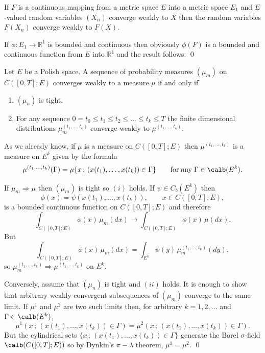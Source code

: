 \documentclass[preprint]{imsart}
\def\R{\mathbb R}
\begin{document}
{\begin{Proposition}
If $F$ is a continuous mapping from a metric space $E$
into a metric space $E_1$ and $E$-valued random
variables $(X_n)$ converge weakly to $X$ then the
random variables $F(X_n)$ converge weakly to $F(X)$.
\end{Proposition}

If $\phi : E_1\to\R^1$ is bounded and continuous then
obviously $\phi(F)$ is a bounded and continuous
function from $E$ into $\R^1$ and the result follows.
\qed

\begin{Theorem}
Let $E$ be a  Polish space.
A sequence of probability measures $(\mu_m)$ on
$C([0,T];E)$
 converges weakly to a measure $\mu$ if and only if
\begin{enumerate}
  \item[(i)] $(\mu_n)$ is tight.

  \item[(ii)] For any sequence $0=t_0\leq t_1\leq t_2
  \leq\ldots\leq t_k\leq T$ the finite dimensional
  distributions $\mu_m^{(t_1,\ldots ,t_k)}$ converge
  weakly to $\mu^{(t_1,\ldots ,t_k)}$.
\end{enumerate}
\end{Theorem}


\begin{Remark}\begin{em}
As we already know, if $\mu$ is a measure on
$C([0,T];E)$ then $\mu^{(t_1,\ldots ,t_k)}$ is a
measure on $E^k$ given by the formula
$$
\mu^{(t_1,\ldots ,t_k)}(\Gamma)=
\mu \{x\, ;\, (x(t_1),\ldots,x(t_k))\in\Gamma\}
\qquad {\rm for \; any \; }\Gamma\in \calb(E^k).
$$
\end{em}
\end{Remark}


If $\mu_m\Rightarrow \mu$ then $(\mu_m)$ is tight so
$(i)$ holds. If $\psi\in C_b(E^k)$ then
$$\phi(x)=\psi (x(t_1),\ldots,x(t_k)) ,
\qquad x\in C([0,T];E),
$$
 is a
bounded continuous function on $C([0,T];E)$ and
therefore
$$
\int_{C([0,T];E)}\phi(x)\, \mu_m(dx)
\to \int_{C([0,T];E)}\phi(x)\, \mu(dx).
$$
But
$$
\int_{C([0,T];E)}\phi(x)\, \mu_m(dx)=
\int_{E^k}\psi (y)\, \mu_m^{(t_1,\ldots,t_k)}(dy),
$$
so $\mu_m^{(t_1,\ldots,t_k)}\Rightarrow
\mu^{(t_1,\ldots,t_k)}$ on $E^k$.

Conversely, assume that $(\mu_n)$ is tight and $(ii)$
holds. It is enough to show that arbitrary weakly
convergent subsequences of $(\mu_m)$ converge to the
same limit. If $\mu^1$ and $\mu^2$ are two such limits
then, for arbitrary $k=1,2,\ldots$ and $\Gamma\in
\calb(E^k)$,
$$
\mu^1\left( x\, ;\, (x(t_1),\ldots,x(t_k))\in\Gamma \right)
=
\mu^2\left( x\, ;\, (x(t_1),\ldots,x(t_k))\in\Gamma \right).
$$
But the cylindrical sets $\{x\, ;\,
(x(t_1),\ldots,x(t_k))\in\Gamma\}$ generate the Borel
$\sigma$-field $\calb(C([0,T];E))$ so by Dynkin's
$\pi-\lambda$ theorem, $\mu^1=\mu^2$. \qed



}
\end{document}
